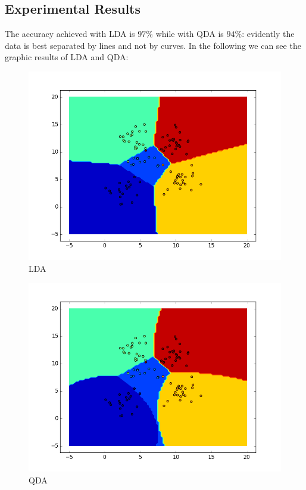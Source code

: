 \documentclass{article}
\begin{document}
\subsection{Experimental Results}
The accuracy achieved with LDA is $97\%$ while with QDA is $94\%$: evidently the data is best separated by lines and not by curves.
In the following we can see the graphic results of LDA and QDA:
\begin{figure}[h]
  \includegraphics[width=\textwidth]{lda.png}
  \caption{LDA}
\end{figure}
\begin{figure}[h]
  \includegraphics[width=\textwidth]{qda.png}
  \caption{QDA}
\end{figure}
\end{document}
